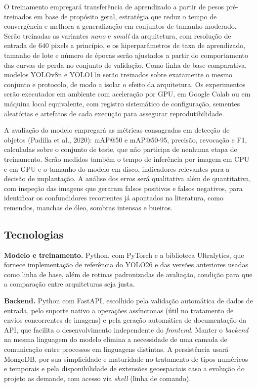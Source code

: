 \documentclass[12pt]{article}
\begin{document}
O treinamento empregará transferência de aprendizado a partir de pesos
pré-treinados em base de propósito geral, estratégia que reduz o tempo de
convergência e melhora a generalização em conjuntos de tamanho moderado.
Serão treinadas as variantes \emph{nano} e \emph{small} da arquitetura,
com resolução de entrada de 640 pixels a princípio, e os hiperparâmetros
de taxa de aprendizado, tamanho de lote e número de épocas serão
ajustados a partir do comportamento das curvas de perda no conjunto de
validação. Como linha de base comparativa, modelos YOLOv8n e YOLO11n
serão treinados sobre exatamente o mesmo conjunto e protocolo, de modo a
isolar o efeito da arquitetura. Os experimentos serão executados em
ambiente com aceleração por GPU, em Google Colab ou em máquina local
equivalente, com registro sistemático de configuração, sementes
aleatórias e artefatos de cada execução para assegurar
reprodutibilidade.

A avaliação do modelo empregará as métricas consagradas em detecção de
objetos (Padilla et al., 2020): mAP@50 e mAP@50-95, precisão, revocação e
F1, calculadas sobre o conjunto de teste, que não participa de nenhuma
etapa de treinamento. Serão medidos também o tempo de inferência por
imagem em CPU e em GPU e o tamanho do modelo em disco, indicadores
relevantes para a decisão de implantação. A análise dos erros será
qualitativa além de quantitativa, com inspeção das imagens que geraram
falsos positivos e falsos negativos, para identificar os confundidores
recorrentes já apontados na literatura, como remendos, manchas de óleo,
sombras intensas e bueiros.

\subsection{Tecnologias}
\label{sec:tecnologias}

\textbf{Modelo e treinamento.} Python, com PyTorch e a biblioteca
Ultralytics, que fornece implementação de referência do YOLO26 e das
versões anteriores usadas como linha de base, além de rotinas
padronizadas de avaliação, condição para que a comparação entre
arquiteturas seja justa.

\textbf{Backend.} Python com FastAPI, escolhido pela validação automática
de dados de entrada, pelo suporte nativo a operações assíncronas (útil no
tratamento de envios concorrentes de imagens) e pela geração automática
de documentação da API, que facilita o desenvolvimento independente do
\emph{frontend}. Manter o \emph{backend} na mesma linguagem do modelo
elimina a necessidade de uma camada de comunicação entre processos em
linguagens distintas. A persistência usará MongoDB, por sua simplicidade e maturidade no
tratamento de tipos numéricos e temporais e pela disponibilidade de
extensões geoespaciais caso a evolução do projeto as demande, com acesso
via \emph{shell} (linha de comando).
\end{document}
